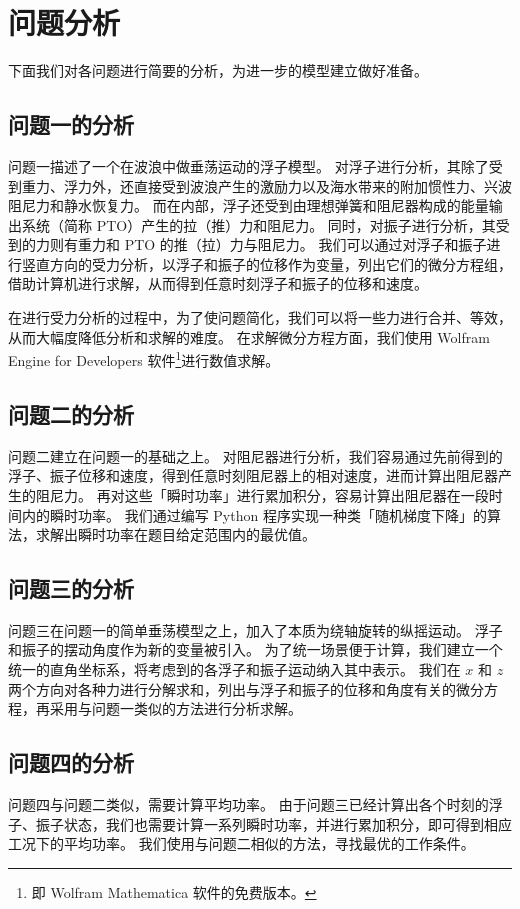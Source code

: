 \section{问题分析}

下面我们对各问题进行简要的分析，为进一步的模型建立做好准备。

\subsection{问题一的分析}

问题一描述了一个在波浪中做垂荡运动的浮子模型。
对浮子进行分析，其除了受到重力、浮力外，还直接受到波浪产生的激励力以及海水带来的附加惯性力、兴波阻尼力和静水恢复力。
而在内部，浮子还受到由理想弹簧和阻尼器构成的能量输出系统（简称 PTO）产生的拉（推）力和阻尼力。
同时，对振子进行分析，其受到的力则有重力和 PTO 的推（拉）力与阻尼力。
我们可以通过对浮子和振子进行竖直方向的受力分析，以浮子和振子的位移作为变量，列出它们的微分方程组，借助计算机进行求解，从而得到任意时刻浮子和振子的位移和速度。

在进行受力分析的过程中，为了使问题简化，我们可以将一些力进行合并、等效，从而大幅度降低分析和求解的难度。
在求解微分方程方面，我们使用 Wolfram Engine for Developers 软件\footnote{即 Wolfram Mathematica 软件的免费版本。}进行数值求解。

\subsection{问题二的分析}

问题二建立在问题一的基础之上。
对阻尼器进行分析，我们容易通过先前得到的浮子、振子位移和速度，得到任意时刻阻尼器上的相对速度，进而计算出阻尼器产生的阻尼力。
再对这些「瞬时功率」进行累加积分，容易计算出阻尼器在一段时间内的瞬时功率。
我们通过编写 Python 程序实现一种类「随机梯度下降」的算法，求解出瞬时功率在题目给定范围内的最优值。

\subsection{问题三的分析}

问题三在问题一的简单垂荡模型之上，加入了本质为绕轴旋转的纵摇运动。
浮子和振子的摆动角度作为新的变量被引入。
为了统一场景便于计算，我们建立一个统一的直角坐标系，将考虑到的各浮子和振子运动纳入其中表示。
我们在 $x$ 和 $z$ 两个方向对各种力进行分解求和，列出与浮子和振子的位移和角度有关的微分方程，再采用与问题一类似的方法进行分析求解。

\subsection{问题四的分析}

问题四与问题二类似，需要计算平均功率。
由于问题三已经计算出各个时刻的浮子、振子状态，我们也需要计算一系列瞬时功率，并进行累加积分，即可得到相应工况下的平均功率。
我们使用与问题二相似的方法，寻找最优的工作条件。